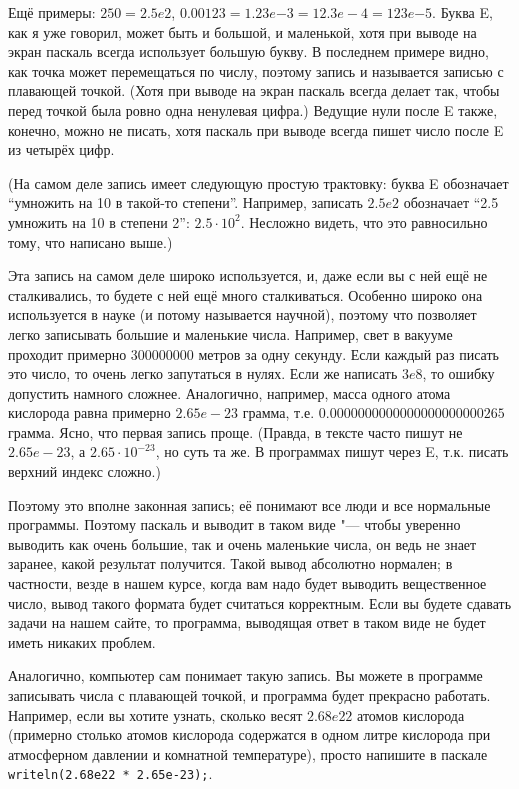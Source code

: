 Ещё примеры: $250=2.5e2$, $0.00123=1.23e{-3}=12.3e{-}4=123e{-5}$. Буква E, как я уже говорил, может быть 
и большой, и маленькой, хотя при выводе на экран паскаль всегда использует большую букву. В 
последнем примере видно, как точка может перемещаться по числу, поэтому запись и называется записью 
с плавающей точкой. (Хотя при выводе на экран паскаль всегда делает так, чтобы перед точкой была 
ровно одна ненулевая цифра.) Ведущие нули после E также, конечно, можно не писать, хотя паскаль при выводе всегда 
пишет число после E из четырёх цифр.

(На самом деле запись имеет следующую простую трактовку: буква E обозначает ``умножить на 10 в 
такой-то степени''. Например, записать $2.5e2$ обозначает ``2.5 умножить на 10 в степени 2'': 
$2.5\cdot 10^2$. Несложно видеть, что это равносильно тому, что написано выше.)

Эта запись на самом деле широко используется, и, даже если вы с ней ещё не сталкивались, то будете 
с ней ещё много сталкиваться. Особенно широко она используется в науке (и потому называется 
научной), поэтому что позволяет легко записывать большие и маленькие числа. Например, свет в 
вакууме проходит примерно $300000000$ метров за одну секунду. Если каждый раз писать это число, то 
очень легко запутаться в нулях. Если же написать $3e8$, то ошибку допустить намного сложнее. 
Аналогично, например, масса одного атома кислорода равна примерно $2.65e{-}23$ грамма, т.е. 
$0.0000000000000000000000265$ грамма. Ясно, что первая запись проще. (Правда, в тексте часто пишут 
не $2.65e{-}23$, а $2.65\cdot 10^{-23}$, но суть та же. В программах пишут через E, т.к. писать 
верхний индекс сложно.) 

Поэтому это вполне законная запись; её понимают все люди и все нормальные программы. Поэтому паскаль и выводит в таком виде "--- чтобы уверенно выводить как очень большие, так и очень маленькие числа, он ведь не знает заранее, какой результат получится. Такой вывод абсолютно нормален; в частности, везде в нашем курсе, когда вам надо будет выводить вещественное число, вывод такого формата будет считаться корректным. Если вы будете сдавать задачи на нашем сайте, то программа, выводящая ответ в таком виде не будет иметь никаких проблем.

Аналогично, компьютер сам понимает такую запись. Вы можете в программе записывать числа с плавающей 
точкой, и программа будет прекрасно работать. Например, если вы хотите узнать, сколько весят 
$2.68e22$ атомов кислорода (примерно столько атомов кислорода содержатся в одном литре кислорода 
при атмосферном давлении и комнатной температуре), просто напишите в паскале \verb`writeln(2.68e22 * 2.65e-23);`.

